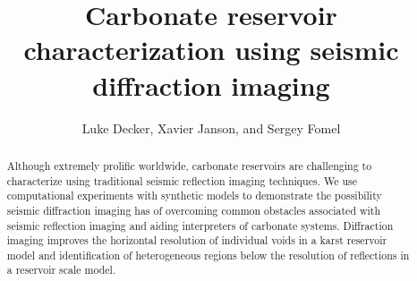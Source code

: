 
\title{Carbonate reservoir characterization using seismic diffraction imaging}

\author{Luke Decker, Xavier Janson, and Sergey Fomel}

\address{
Bureau of Economic Geology \\
John A. and Katherine G. Jackson School of Geosciences \\
The University of Texas at Austin \\
University Station, Box X \\
Austin, TX 78713-8924 \\
}

\maketitle
\begin{abstract}
Although extremely prolific worldwide, carbonate reservoirs are challenging to characterize using traditional seismic reflection imaging techniques.  We use computational experiments with synthetic models to demonstrate the possibility seismic diffraction imaging has of overcoming common obstacles associated with seismic reflection imaging and aiding interpreters of carbonate systems.  Diffraction imaging  improves the horizontal resolution of individual voids in a karst reservoir model and identification of heterogeneous regions below the resolution of reflections in a reservoir scale model. 
\end{abstract}

